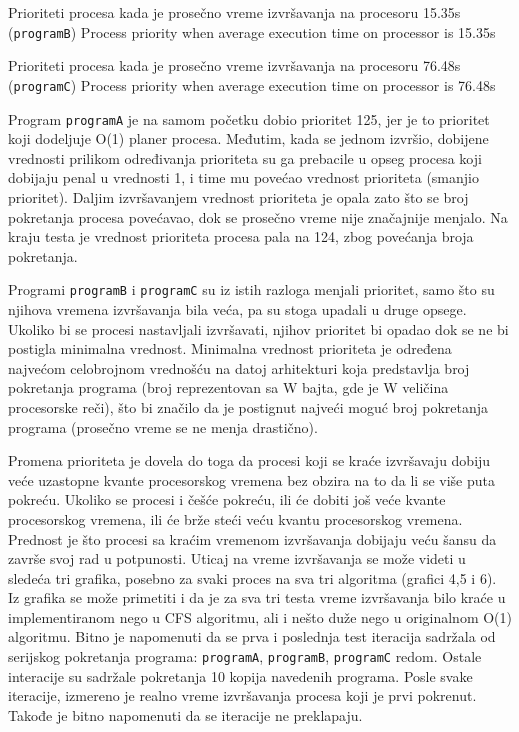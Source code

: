     {Prioriteti procesa kada je prosečno vreme izvršavanja na procesoru 15.35s (\texttt{programB})}
    {Process priority when average execution time on processor is 15.35s}

    {Prioriteti procesa kada je prosečno vreme izvršavanja na procesoru 76.48s (\texttt{programC})}
    {Process priority when average execution time on processor is 76.48s}

Program \texttt{programA} je na samom početku dobio prioritet 125, jer je to prioritet koji dodeljuje O(1) planer procesa. Međutim, kada se jednom izvršio, dobijene vrednosti prilikom određivanja prioriteta su ga prebacile u opseg procesa koji dobijaju penal u vrednosti 1, i time mu povećao vrednost prioriteta (smanjio prioritet). Daljim izvršavanjem vrednost prioriteta je opala zato što se broj pokretanja procesa povećavao, dok se prosečno vreme nije značajnije menjalo. Na kraju testa je vrednost prioriteta procesa pala na 124, zbog povećanja broja pokretanja.

Programi \texttt{programB} i \texttt{programC} su iz istih razloga menjali prioritet, samo što su njihova vremena izvršavanja bila veća, pa su stoga upadali u druge opsege. Ukoliko bi se procesi nastavljali izvršavati, njihov prioritet bi opadao dok se ne bi postigla minimalna vrednost. Minimalna vrednost prioriteta je određena najvećom celobrojnom vrednošću na datoj arhitekturi koja predstavlja broj pokretanja programa (broj reprezentovan sa W bajta, gde je W veličina procesorske reči), što bi značilo da je postignut najveći moguć broj pokretanja programa (prosečno vreme se ne menja drastično).

Promena prioriteta je dovela do toga da procesi koji se kraće izvršavaju dobiju veće uzastopne kvante procesorskog vremena bez obzira na to da li se više puta pokreću. Ukoliko se procesi i češće pokreću, ili će dobiti još veće kvante procesorskog vremena, ili će brže steći veću kvantu procesorskog vremena. Prednost je što procesi sa kraćim vremenom izvršavanja dobijaju veću šansu da završe svoj rad u potpunosti. Uticaj na vreme izvršavanja se može videti u sledeća tri grafika, posebno za svaki proces na sva tri algoritma (grafici 4,5 i 6). Iz grafika se može primetiti i da je za sva tri testa vreme izvršavanja bilo kraće u implementiranom nego u CFS algoritmu, ali i nešto duže nego u originalnom O(1) algoritmu. Bitno je napomenuti da se prva i poslednja test iteracija sadržala od serijskog pokretanja programa: \texttt{programA}, \texttt{programB}, \texttt{programC} redom. Ostale interacije su sadržale pokretanja 10 kopija navedenih programa. Posle svake iteracije, izmereno je realno vreme izvršavanja procesa koji je prvi pokrenut. Takođe je bitno napomenuti da se iteracije ne preklapaju.


